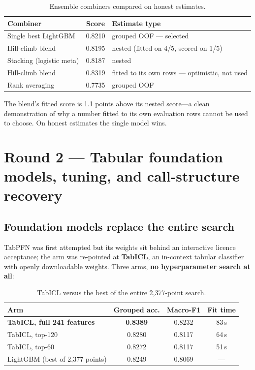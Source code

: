 \documentclass[11pt]{article}
\begin{document}
\begin{table}[htbp]
\centering\small
\caption{Ensemble combiners compared on honest estimates.}
\label{tab:ensemble}
\begin{tabular}{lcl}
\toprule
Combiner & Score & Estimate type \\
\midrule
Single best LightGBM & 0.8210 & grouped OOF --- selected \\
Hill-climb blend & 0.8195 & nested (fitted on 4/5, scored on 1/5) \\
Stacking (logistic meta) & 0.8187 & nested \\
Hill-climb blend & 0.8319 & fitted to its own rows --- optimistic, not used \\
Rank averaging & 0.7735 & grouped OOF \\
\bottomrule
\end{tabular}
\end{table}

The blend's fitted score is 1.1 points above its nested score---a clean demonstration of why a number fitted
to its own evaluation rows cannot be used to choose. On honest estimates the single model wins.

\section{Round 2 --- Tabular foundation models, tuning, and call-structure recovery}
\label{sec:round2}

\subsection{Foundation models replace the entire search}

TabPFN was first attempted but its weights sit behind an interactive licence acceptance; the arm was
re-pointed at \textbf{TabICL}, an in-context tabular classifier with openly downloadable weights. Three
arms, \textbf{no hyperparameter search at all}:

\begin{table}[htbp]
\centering\small
\caption{TabICL versus the best of the entire 2{,}377-point search.}
\label{tab:tabicl}
\begin{tabular}{lccc}
\toprule
Arm & Grouped acc. & Macro-F1 & Fit time \\
\midrule
\textbf{TabICL, full 241 features} & \textbf{0.8389} & 0.8232 & 83\,s \\
TabICL, top-120 & 0.8280 & 0.8117 & 64\,s \\
TabICL, top-60 & 0.8272 & 0.8117 & 51\,s \\
LightGBM (best of 2{,}377 points) & 0.8249 & 0.8069 & --- \\
\bottomrule
\end{tabular}
\end{table}
\end{document}
